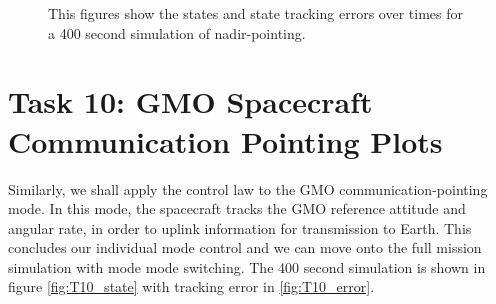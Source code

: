 \documentclass[paper]{aiaaNew}
\begin{document}
\begin{figure}[!htbp] 
\centering     %
{}
\caption{This figures show the states and state tracking errors over times for a 400 second simulation of nadir-pointing.}
\end{figure}





\section*{Task 10: GMO Spacecraft Communication Pointing Plots}
Similarly, we shall apply the control law to the GMO communication-pointing mode. In this mode, the spacecraft tracks the GMO reference attitude and angular rate, in order to uplink information for transmission to Earth. This concludes our individual mode control and we can move onto the full mission simulation with mode mode switching. The 400 second simulation is shown in figure \ref{fig:T10_state} with tracking error in \ref{fig:T10_error}.
\end{document}
